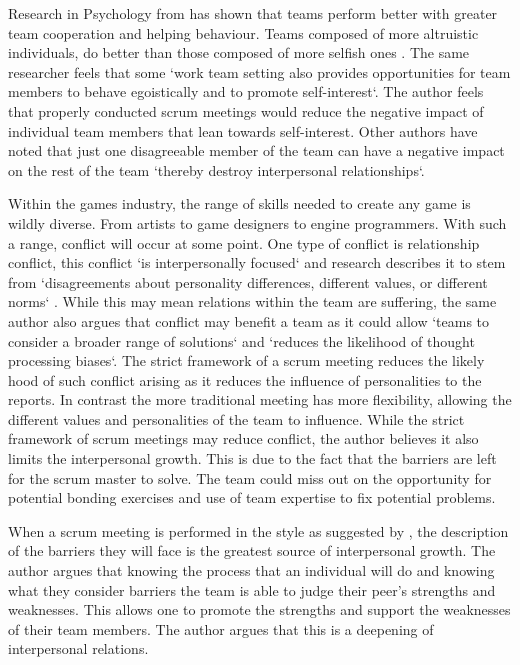 \documentclass{scrartcl}
\begin{document}
Research in Psychology from \cite{li2014toward} has shown that teams perform better with greater team cooperation and helping behaviour. Teams composed of more altruistic individuals, do better than those composed of more selfish ones \cite[p. 542]{li2014toward}.  The same researcher feels that some `work team setting also provides opportunities for team members to behave egoistically and to promote self-interest`\cite[p. 542]{li2014toward}. The author feels that properly conducted scrum meetings would reduce the negative impact of individual team members that lean towards self-interest. Other authors have noted that just one disagreeable member of the team can have a negative impact on the rest of the team `thereby destroy interpersonal relationships`\cite[p. 381] {barrick1998relating}.

Within the games industry, the range of skills needed to create any game is wildly diverse. From artists to game designers to engine programmers. With such a range, conflict will occur at some point\cite{gorse2007communication}. One type of conflict is relationship conflict, this conflict `is interpersonally focused` \cite [p. 215]{costa2015direct} and research describes it to stem from `disagreements about personality differences, different values, or different norms` \cite [p. 215]{costa2015direct}. While this may mean relations within the team are suffering, the same author also argues that conflict may benefit a team as it could allow `teams to consider a broader range of solutions` and `reduces the likelihood of thought processing biases`\cite [p. 215]{costa2015direct}. The strict framework of a scrum meeting reduces the likely hood of such conflict arising as it reduces the influence of personalities to the reports. In contrast the more traditional meeting \cite{costa2015direct, gorse2007communication}  has more flexibility, allowing the different values and personalities of the team to influence. While the strict framework of scrum meetings may reduce conflict, the author believes it also limits the interpersonal growth. This is due to the fact that the barriers are left for the scrum master to solve. The team could miss out on the opportunity for potential bonding exercises and use of team expertise to fix potential problems.

When a scrum meeting is performed in the style as suggested by \cite{ DailyScrum, EffectiveScrum}, the description of the barriers they will face is the greatest source of interpersonal growth. The author argues that knowing the process that an individual will do and knowing what they consider barriers the team is able to judge their peer’s strengths and weaknesses. This allows one to promote the strengths and support the weaknesses of their team members. The author argues that this is a deepening of interpersonal relations.
\end{document}
